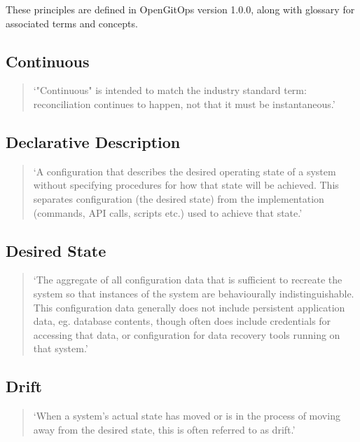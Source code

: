 
These principles are defined in OpenGitOps version 1.0.0,
along with glossary
\autocite{gitopsGlossary}
for associated terms and concepts.

\subsection*{Continuous}
\begin{quotation}
\noindent
\enquote*{"Continuous" is intended to match the industry standard term: reconciliation continues to happen, not that it must be instantaneous.}
\autocite{gitopsGlossary}
\end{quotation}

\subsection*{Declarative Description}
\begin{quotation}
\noindent
\enquote*{A configuration that describes the desired operating state of a system without specifying procedures for how that state will be achieved. This separates configuration (the desired state) from the implementation (commands, API calls, scripts etc.) used to achieve that state.}
\autocite{gitopsGlossary}
\end{quotation}

\subsection*{Desired State}
\begin{quotation}
\noindent
\enquote*{The aggregate of all configuration data that is sufficient to recreate the system so that instances of the system are behaviourally indistinguishable. This configuration data generally does not include persistent application data, eg. database contents, though often does include credentials for accessing that data, or configuration for data recovery tools running on that system.}
\autocite{gitopsGlossary}
\end{quotation}

\subsection*{Drift}
\begin{quotation}
\noindent
\enquote*{When a system's actual state has moved or is in the process of moving away from the desired state, this is often referred to as drift.}
\autocite{gitopsGlossary}
\end{quotation}


